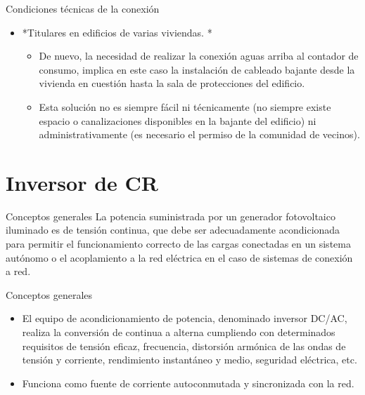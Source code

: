 \documentclass[xcolor={usenames,svgnames,dvipsnames}]{beamer}
\begin{document}
\begin{frame}[label=sec-1-0-23]{Condiciones técnicas de la conexión}
\begin{itemize}
\item *Titulares en edificios de varias viviendas. *

\begin{itemize}
\item De nuevo, la necesidad de realizar la conexión aguas arriba al
contador de consumo, implica en este caso la instalación de
cableado bajante desde la vivienda en cuestión hasta la sala de
protecciones del edificio.

\item Esta solución no es siempre fácil ni técnicamente (no siempre
existe espacio o canalizaciones disponibles en la bajante del
edificio) ni administrativamente (es necesario el permiso de la
comunidad de vecinos).
\end{itemize}
\end{itemize}
\end{frame}

\section{Inversor de CR}
\label{sec-2}

\begin{frame}[label=sec-2-0-1]{Conceptos generales}
La potencia suministrada por un generador fotovoltaico iluminado es de
tensión continua, que debe ser adecuadamente acondicionada para permitir
el funcionamiento correcto de las cargas conectadas en un sistema
autónomo o el acoplamiento a la red eléctrica en el caso de sistemas de
conexión a red.
\end{frame}

\begin{frame}[label=sec-2-0-2]{Conceptos generales}
\begin{itemize}
\item El equipo de acondicionamiento de potencia, denominado inversor
DC/AC, realiza la conversión de continua a alterna cumpliendo con
determinados requisitos de tensión eficaz, frecuencia, distorsión
armónica de las ondas de tensión y corriente, rendimiento instantáneo
y medio, seguridad eléctrica, etc.

\item Funciona como fuente de corriente autoconmutada y sincronizada con la
red.
\end{itemize}
\end{frame}
\end{document}
